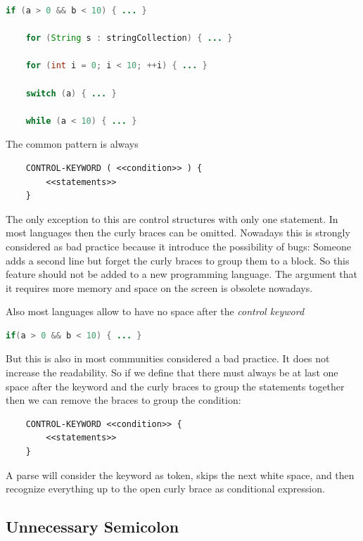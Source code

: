 \documentclass[11pt, a4paper]{report}
\begin{document}
\begin{lstlisting}[language=Java]
    if (a > 0 && b < 10) { ... }
    
    for (String s : stringCollection) { ... }
    
    for (int i = 0; i < 10; ++i) { ... }
    
    switch (a) { ... }
    
    while (a < 10) { ... }
\end{lstlisting}

The common pattern is always

\begin{lstlisting}
    CONTROL-KEYWORD ( <<condition>> ) { 
        <<statements>> 
    }
\end{lstlisting}

The only exception to this are control structures with only one statement. In most languages then the curly braces can be omitted. Nowadays this is strongly considered as bad practice because it introduce the possibility of bugs: Someone adds a second line but forget the curly braces to group them to a block. So this feature should not be added to a new programming language. The argument that it requires more memory and space on the screen is obsolete nowadays.

Also most languages allow to have no space after the \textit{control keyword}

\begin{lstlisting}[language=Java]
    if(a > 0 && b < 10) { ... }
\end{lstlisting}

But this is also in most communities considered a bad practice. It does not increase the readability. So if we define that there must always be at last one  space after the keyword and the curly braces to group the statements together  then we can remove the braces to group the condition:

\begin{lstlisting}
    CONTROL-KEYWORD <<condition>> { 
        <<statements>> 
    }
\end{lstlisting}

A parse will consider the keyword as token, skips the next white space, and then recognize everything up to the open curly brace as conditional expression.

\subsection{Unnecessary Semicolon}
\end{document}

